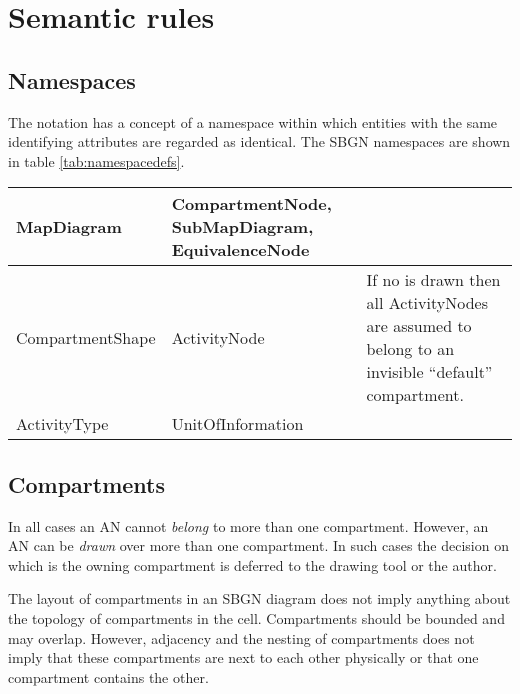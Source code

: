 \section{Semantic rules}

\subsection{Namespaces}

The notation has a concept of a namespace within which entities with the same identifying attributes are regarded as identical. The SBGN namespaces are shown
in table \ref{tab:namespacedefs}.

\begin{center}
\label{tab:namespacedefs}
\begin{small}
\tablelasttail{\hline}
\begin{supertabular}{|l|p{5cm}|p{5cm}|}\hline
%
MapDiagram & CompartmentNode, SubMapDiagram, EquivalenceNode & \\\hline
%
CompartmentShape & ActivityNode & If no  is drawn then all ActivityNodes are assumed to belong to an invisible ``default'' compartment.\\\hline
ActivityType & UnitOfInformation & \\\hline
\end{supertabular}
\end{small}
\end{center}

\subsection{Compartments}

In all cases an AN cannot \emph{belong} to more than one compartment. However, an AN can be \emph{drawn} over more than one compartment. In such cases the decision on which is the owning compartment is deferred to the drawing tool or the author. 

The layout of compartments in an SBGN diagram does not imply anything about the topology of compartments in the cell. Compartments should be bounded and may overlap. However, adjacency and the nesting of compartments does not imply that these compartments are next to each other physically or that one compartment contains the other.

